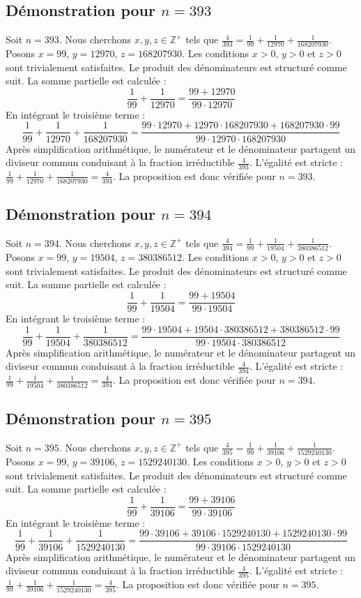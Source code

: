 \documentclass[11pt,a4paper]{article}
\begin{document}
\subsection{Démonstration pour $n = 393$}
Soit $n = 393$. Nous cherchons $x, y, z \in \mathbb{Z}^{+}$ tels que $\frac{4}{393} = \frac{1}{99} + \frac{1}{12970} + \frac{1}{168207930}$.
Posons $x = 99$, $y = 12970$, $z = 168207930$.
Les conditions $x > 0$, $y > 0$ et $z > 0$ sont trivialement satisfaites.
Le produit des dénominateurs est structuré comme suit. La somme partielle est calculée :
$$ \frac{1}{99} + \frac{1}{12970} = \frac{99+12970}{99 \cdot 12970} $$
En intégrant le troisième terme :
$$ \frac{1}{99} + \frac{1}{12970} + \frac{1}{168207930} = \frac{99 \cdot 12970 + 12970 \cdot 168207930 + 168207930 \cdot 99}{99 \cdot 12970 \cdot 168207930} $$
Après simplification arithmétique, le numérateur et le dénominateur partagent un diviseur commun conduisant à la fraction irréductible $\frac{4}{393}$.
L'égalité est stricte : $\frac{1}{99} + \frac{1}{12970} + \frac{1}{168207930} = \frac{4}{393}$.
La proposition est donc vérifiée pour $n = 393$.
\subsection{Démonstration pour $n = 394$}
Soit $n = 394$. Nous cherchons $x, y, z \in \mathbb{Z}^{+}$ tels que $\frac{4}{394} = \frac{1}{99} + \frac{1}{19504} + \frac{1}{380386512}$.
Posons $x = 99$, $y = 19504$, $z = 380386512$.
Les conditions $x > 0$, $y > 0$ et $z > 0$ sont trivialement satisfaites.
Le produit des dénominateurs est structuré comme suit. La somme partielle est calculée :
$$ \frac{1}{99} + \frac{1}{19504} = \frac{99+19504}{99 \cdot 19504} $$
En intégrant le troisième terme :
$$ \frac{1}{99} + \frac{1}{19504} + \frac{1}{380386512} = \frac{99 \cdot 19504 + 19504 \cdot 380386512 + 380386512 \cdot 99}{99 \cdot 19504 \cdot 380386512} $$
Après simplification arithmétique, le numérateur et le dénominateur partagent un diviseur commun conduisant à la fraction irréductible $\frac{4}{394}$.
L'égalité est stricte : $\frac{1}{99} + \frac{1}{19504} + \frac{1}{380386512} = \frac{4}{394}$.
La proposition est donc vérifiée pour $n = 394$.
\subsection{Démonstration pour $n = 395$}
Soit $n = 395$. Nous cherchons $x, y, z \in \mathbb{Z}^{+}$ tels que $\frac{4}{395} = \frac{1}{99} + \frac{1}{39106} + \frac{1}{1529240130}$.
Posons $x = 99$, $y = 39106$, $z = 1529240130$.
Les conditions $x > 0$, $y > 0$ et $z > 0$ sont trivialement satisfaites.
Le produit des dénominateurs est structuré comme suit. La somme partielle est calculée :
$$ \frac{1}{99} + \frac{1}{39106} = \frac{99+39106}{99 \cdot 39106} $$
En intégrant le troisième terme :
$$ \frac{1}{99} + \frac{1}{39106} + \frac{1}{1529240130} = \frac{99 \cdot 39106 + 39106 \cdot 1529240130 + 1529240130 \cdot 99}{99 \cdot 39106 \cdot 1529240130} $$
Après simplification arithmétique, le numérateur et le dénominateur partagent un diviseur commun conduisant à la fraction irréductible $\frac{4}{395}$.
L'égalité est stricte : $\frac{1}{99} + \frac{1}{39106} + \frac{1}{1529240130} = \frac{4}{395}$.
La proposition est donc vérifiée pour $n = 395$.
\end{document}
